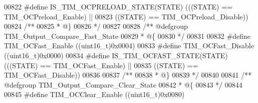 \begin{DoxyCode}
00822 \textcolor{preprocessor}{#}\textcolor{preprocessor}{define} \textcolor{preprocessor}{IS\_TIM\_OCPRELOAD\_STATE}\textcolor{preprocessor}{(}\textcolor{preprocessor}{STATE}\textcolor{preprocessor}{)} \textcolor{preprocessor}{(}\textcolor{preprocessor}{(}\textcolor{preprocessor}{(}\textcolor{preprocessor}{STATE}\textcolor{preprocessor}{)} \textcolor{preprocessor}{==} TIM_OCPreload_Enable\textcolor{preprocessor}{)} \textcolor{preprocessor}{||}
00823                                        \textcolor{preprocessor}{(}\textcolor{preprocessor}{(}\textcolor{preprocessor}{STATE}\textcolor{preprocessor}{)} \textcolor{preprocessor}{==} TIM_OCPreload_Disable\textcolor{preprocessor}{)}\textcolor{preprocessor}{)}
00824 \textcolor{comment}{/**}
00825 \textcolor{comment}{  * @\}}
00826 \textcolor{comment}{  */}
00827 
00828 \textcolor{comment}{/** @defgroup TIM\_Output\_Compare\_Fast\_State }
00829 \textcolor{comment}{  * @\{}
00830 \textcolor{comment}{  */}
00831 
00832 \textcolor{preprocessor}{#}\textcolor{preprocessor}{define} \textcolor{preprocessor}{TIM\_OCFast\_Enable}                  \textcolor{preprocessor}{(}\textcolor{preprocessor}{(}\textcolor{preprocessor}{uint16\_t}\textcolor{preprocessor}{)}0x0004\textcolor{preprocessor}{)}
00833 \textcolor{preprocessor}{#}\textcolor{preprocessor}{define} \textcolor{preprocessor}{TIM\_OCFast\_Disable}                 \textcolor{preprocessor}{(}\textcolor{preprocessor}{(}\textcolor{preprocessor}{uint16\_t}\textcolor{preprocessor}{)}0x0000\textcolor{preprocessor}{)}
00834 \textcolor{preprocessor}{#}\textcolor{preprocessor}{define} \textcolor{preprocessor}{IS\_TIM\_OCFAST\_STATE}\textcolor{preprocessor}{(}\textcolor{preprocessor}{STATE}\textcolor{preprocessor}{)} \textcolor{preprocessor}{(}\textcolor{preprocessor}{(}\textcolor{preprocessor}{(}\textcolor{preprocessor}{STATE}\textcolor{preprocessor}{)} \textcolor{preprocessor}{==} TIM_OCFast_Enable\textcolor{preprocessor}{)} \textcolor{preprocessor}{||}
00835                                     \textcolor{preprocessor}{(}\textcolor{preprocessor}{(}\textcolor{preprocessor}{STATE}\textcolor{preprocessor}{)} \textcolor{preprocessor}{==} TIM_OCFast_Disable\textcolor{preprocessor}{)}\textcolor{preprocessor}{)}
00836 
00837 \textcolor{comment}{/**}
00838 \textcolor{comment}{  * @\}}
00839 \textcolor{comment}{  */}
00840 
00841 \textcolor{comment}{/** @defgroup TIM\_Output\_Compare\_Clear\_State }
00842 \textcolor{comment}{  * @\{}
00843 \textcolor{comment}{  */}
00844 
00845 \textcolor{preprocessor}{#}\textcolor{preprocessor}{define} \textcolor{preprocessor}{TIM\_OCClear\_Enable}                 \textcolor{preprocessor}{(}\textcolor{preprocessor}{(}\textcolor{preprocessor}{uint16\_t}\textcolor{preprocessor}{)}0x0080\textcolor{preprocessor}{)}

\end{DoxyCode}
